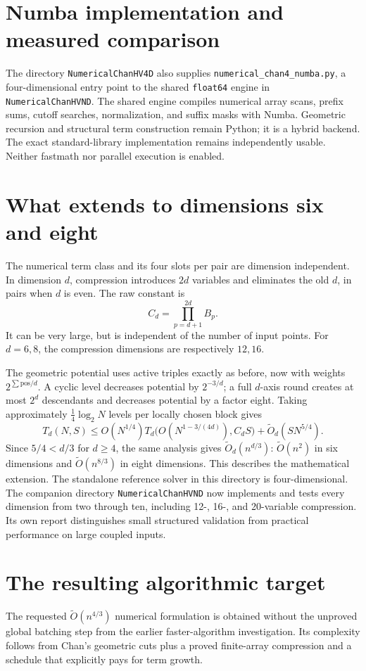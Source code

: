\documentclass[12pt,a4paper]{article}
\theoremstyle{remark}
\newcommand{\1}{\mathbf1}
\newcommand{\wtO}{\widetilde O}
\begin{document}
\section{Numba implementation and measured comparison}
The directory \texttt{NumericalChanHV4D} also supplies
\texttt{numerical\_chan4\_numba.py}, a four-dimensional entry point to
the shared \texttt{float64} engine in \texttt{NumericalChanHVND}.
The shared engine compiles numerical array scans, prefix sums, cutoff
searches, normalization, and suffix masks with Numba. Geometric recursion
and structural term construction remain Python; it is a hybrid backend.
The exact standard-library implementation remains independently usable.
Neither fastmath nor parallel execution is enabled.



\section{What extends to dimensions six and eight}
The numerical term class and its four slots per pair are dimension
independent. In dimension $d$, compression introduces $2d$ variables
and eliminates the old $d$, in pairs when $d$ is even. The raw constant is
\[
                   C_d=\prod_{p=d+1}^{2d}B_p.
\]
It can be very large, but is independent of the number of input points.
For $d=6,8$, the compression dimensions are respectively $12,16$.

The geometric potential uses active triples exactly as before, now with
weights $2^{\sum\mathrm{pos}/d}$. A cyclic level decreases potential by
$2^{-3/d}$; a full $d$-axis round creates at most $2^d$ descendants and
decreases potential by a factor eight. Taking approximately
$\tfrac14\log_2N$ levels per locally chosen block gives
\[
 T_d(N,S)\le O(N^{1/4})
       T_d\bigl(O(N^{1-3/(4d)}),C_dS\bigr)
                 +\wtO_d(SN^{5/4}).
\]
Since $5/4<d/3$ for $d\ge4$, the same analysis gives
$\wtO_d(n^{d/3})$: $\wtO(n^2)$ in six dimensions and
$\wtO(n^{8/3})$ in eight dimensions. This describes the mathematical
extension. The standalone reference solver in this directory is
four-dimensional. The companion directory \texttt{NumericalChanHVND}
now implements and tests every dimension from two through ten, including
12-, 16-, and 20-variable compression. Its own report distinguishes small
structured validation from practical performance on large coupled inputs.

\section{The resulting algorithmic target}
The requested $\wtO(n^{4/3})$ numerical formulation is obtained without
the unproved global batching step from the earlier faster-algorithm
investigation. Its complexity follows from Chan's geometric cuts plus a
proved finite-array compression and a schedule that explicitly pays for
term growth.
\end{document}
